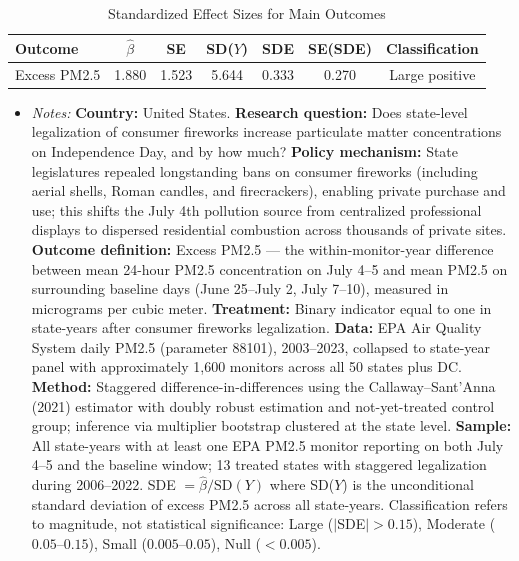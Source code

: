\begin{table}[H]
\centering
\caption{Standardized Effect Sizes for Main Outcomes}
\label{tab:sde}
\begin{tabular}{lcccccc}
\toprule
Outcome & $\hat{\beta}$ & SE & SD($Y$) & SDE & SE(SDE) & Classification \\
\midrule
Excess PM2.5 & 1.880 & 1.523 & 5.644 & 0.333 & 0.270 & Large positive \\
\bottomrule
\end{tabular}
\par\vspace{0.3em}
\begin{itemize}[leftmargin=*]
\item \textit{Notes:} \textbf{Country:} United States. \textbf{Research question:} Does state-level legalization of consumer fireworks increase particulate matter concentrations on Independence Day, and by how much? \textbf{Policy mechanism:} State legislatures repealed longstanding bans on consumer fireworks (including aerial shells, Roman candles, and firecrackers), enabling private purchase and use; this shifts the July 4th pollution source from centralized professional displays to dispersed residential combustion across thousands of private sites. \textbf{Outcome definition:} Excess PM2.5 --- the within-monitor-year difference between mean 24-hour PM2.5 concentration on July 4--5 and mean PM2.5 on surrounding baseline days (June 25--July 2, July 7--10), measured in micrograms per cubic meter. \textbf{Treatment:} Binary indicator equal to one in state-years after consumer fireworks legalization. \textbf{Data:} EPA Air Quality System daily PM2.5 (parameter 88101), 2003--2023, collapsed to state-year panel with approximately 1,600 monitors across all 50 states plus DC. \textbf{Method:} Staggered difference-in-differences using the Callaway--Sant'Anna (2021) estimator with doubly robust estimation and not-yet-treated control group; inference via multiplier bootstrap clustered at the state level. \textbf{Sample:} All state-years with at least one EPA PM2.5 monitor reporting on both July 4--5 and the baseline window; 13 treated states with staggered legalization during 2006--2022. SDE $= \hat{\beta} / \text{SD}(Y)$ where SD($Y$) is the unconditional standard deviation of excess PM2.5 across all state-years. Classification refers to magnitude, not statistical significance: Large ($|$SDE$| > 0.15$), Moderate ($0.05$--$0.15$), Small ($0.005$--$0.05$), Null ($< 0.005$).
\end{itemize}
\end{table}
